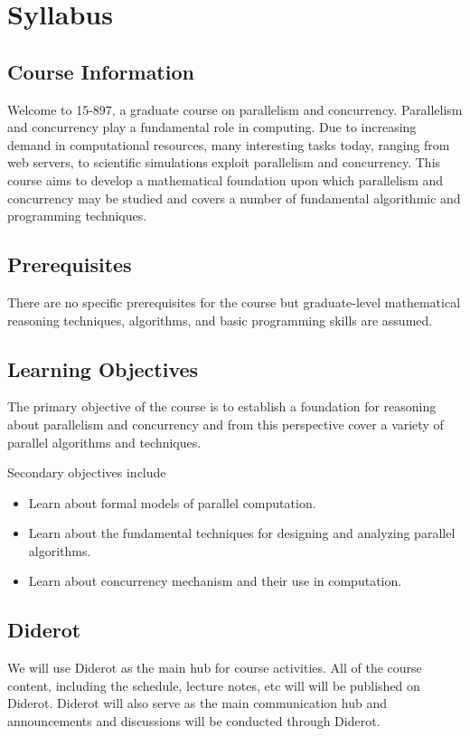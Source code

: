 \chapter{Syllabus}
\label{ch:syllabus}

\section{Course Information}

Welcome to 15-897, a graduate course on parallelism and concurrency. 
%
Parallelism and concurrency play a  fundamental role in computing.
%
Due to increasing demand in computational resources, many interesting tasks today, ranging from web servers, to scientific simulations exploit parallelism and concurrency.
%
This course aims to develop a mathematical foundation upon which parallelism and concurrency may be studied and covers a number of fundamental algorithmic and programming techniques.  
%
 
\section{Prerequisites}
There are no specific prerequisites for the course but graduate-level mathematical reasoning techniques, algorithms, and basic programming skills are assumed.
%

\section{Learning Objectives}

The primary objective of the course is to establish a foundation for reasoning about parallelism and concurrency and from this perspective cover a variety of parallel algorithms and techniques.

Secondary objectives include
\begin{itemize}
\item Learn about formal models of parallel computation.
\item Learn about the fundamental techniques for designing and analyzing parallel algorithms.
\item Learn about concurrency mechanism and their use in computation. 
\end{itemize}


\section{Diderot}
We will use Diderot as the main hub for course activities.
%
All of the course content, including the schedule, lecture notes, etc will 
will be published on Diderot. 
%
Diderot will also serve as the main communication hub and
announcements and discussions will be conducted through Diderot.
%


